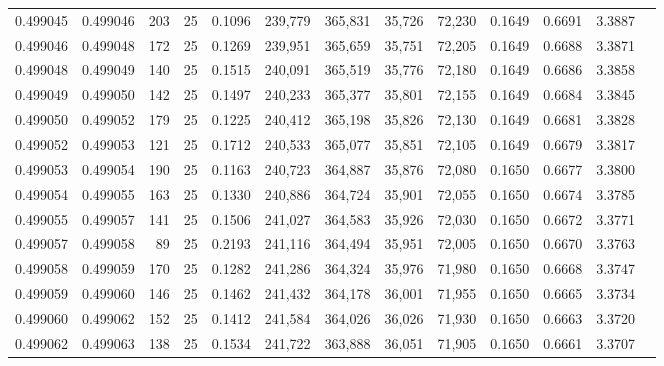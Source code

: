 \begin{tabular}{rrrrrrrrrrrrr}
0.499045 & 0.499046 & 203 &  25 &                                     0.1096 & 239,779 & 365,831 &  35,726 &  72,230 & 0.1649 & 0.6691 & 3.3887 \\
0.499046 & 0.499048 & 172 &  25 &                                     0.1269 & 239,951 & 365,659 &  35,751 &  72,205 & 0.1649 & 0.6688 & 3.3871 \\
0.499048 & 0.499049 & 140 &  25 &                                     0.1515 & 240,091 & 365,519 &  35,776 &  72,180 & 0.1649 & 0.6686 & 3.3858 \\
0.499049 & 0.499050 & 142 &  25 &                                     0.1497 & 240,233 & 365,377 &  35,801 &  72,155 & 0.1649 & 0.6684 & 3.3845 \\
0.499050 & 0.499052 & 179 &  25 &                                     0.1225 & 240,412 & 365,198 &  35,826 &  72,130 & 0.1649 & 0.6681 & 3.3828 \\
0.499052 & 0.499053 & 121 &  25 &                                     0.1712 & 240,533 & 365,077 &  35,851 &  72,105 & 0.1649 & 0.6679 & 3.3817 \\
0.499053 & 0.499054 & 190 &  25 &                                     0.1163 & 240,723 & 364,887 &  35,876 &  72,080 & 0.1650 & 0.6677 & 3.3800 \\
0.499054 & 0.499055 & 163 &  25 &                                     0.1330 & 240,886 & 364,724 &  35,901 &  72,055 & 0.1650 & 0.6674 & 3.3785 \\
0.499055 & 0.499057 & 141 &  25 &                                     0.1506 & 241,027 & 364,583 &  35,926 &  72,030 & 0.1650 & 0.6672 & 3.3771 \\
0.499057 & 0.499058 &  89 &  25 &                                     0.2193 & 241,116 & 364,494 &  35,951 &  72,005 & 0.1650 & 0.6670 & 3.3763 \\
0.499058 & 0.499059 & 170 &  25 &                                     0.1282 & 241,286 & 364,324 &  35,976 &  71,980 & 0.1650 & 0.6668 & 3.3747 \\
0.499059 & 0.499060 & 146 &  25 &                                     0.1462 & 241,432 & 364,178 &  36,001 &  71,955 & 0.1650 & 0.6665 & 3.3734 \\
0.499060 & 0.499062 & 152 &  25 &                                     0.1412 & 241,584 & 364,026 &  36,026 &  71,930 & 0.1650 & 0.6663 & 3.3720 \\
0.499062 & 0.499063 & 138 &  25 &                                     0.1534 & 241,722 & 363,888 &  36,051 &  71,905 & 0.1650 & 0.6661 & 3.3707 \\

\end{tabular}
